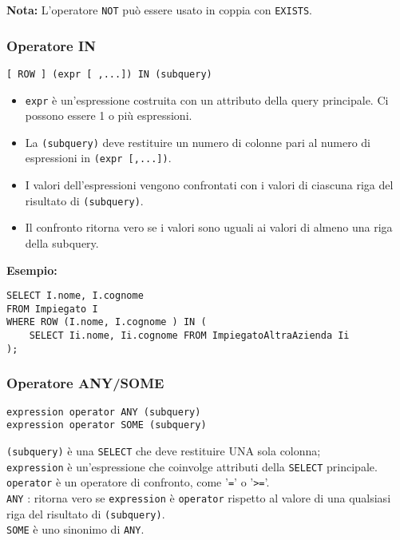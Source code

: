 \documentclass[a4paper, 10pt]{article}
\begin{document}
			\noindent
			\textbf{Nota: } L’operatore \lstinline|NOT| può essere usato in coppia con \lstinline|EXISTS|.
			\bigskip
			
	\subsubsection{Operatore IN}
		\begin{lstlisting}
[ ROW ] (expr [ ,...]) IN (subquery)
		\end{lstlisting}
		
		\begin{itemize}
				\item \lstinline|expr| è un’espressione costruita con un attributo della query principale.
			Ci possono essere 1 o più espressioni.
			
				\item La \lstinline|(subquery)| deve restituire un numero di colonne pari al numero di
			espressioni in \lstinline|(expr [,...])|.
			
				\item I valori dell’espressioni vengono confrontati con i valori di ciascuna riga
			del risultato di \lstinline|(subquery)|.
			
				\item Il confronto ritorna vero se i valori sono uguali ai valori di almeno una
			riga della subquery.
			\end{itemize}
		\textbf{Esempio:} 
		\begin{lstlisting}
SELECT I.nome, I.cognome
FROM Impiegato I
WHERE ROW (I.nome, I.cognome ) IN (
    SELECT Ii.nome, Ii.cognome FROM ImpiegatoAltraAzienda Ii
);
		\end{lstlisting}
		
	\subsubsection{Operatore ANY/SOME}
		\begin{lstlisting}
expression operator ANY (subquery)
expression operator SOME (subquery)
		\end{lstlisting}
		\noindent
		\lstinline|(subquery)| è una \lstinline|SELECT| che deve restituire UNA sola colonna; \\
		\lstinline|expression| è un’espressione che coinvolge attributi della \lstinline|SELECT|
		principale.\\
		\lstinline|operator| è un operatore di confronto, come '\lstinline|=|' o '\lstinline|>=|'.\\
		\lstinline|ANY| : ritorna vero se \lstinline|expression| è \lstinline|operator| rispetto al valore di una qualsiasi riga del risultato di \lstinline|(subquery)|.\\
		\lstinline|SOME| è uno sinonimo di \lstinline|ANY|.
		
\end{document}
